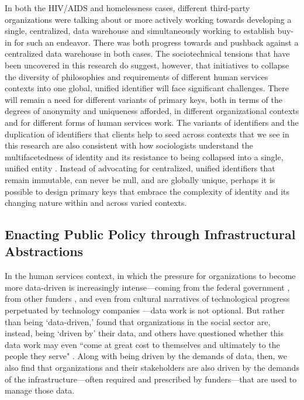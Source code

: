 In both the HIV/AIDS and homelessness cases, different third-party organizations were talking about or more actively working towards developing a single, centralized, data warehouse and simultaneously working to establish buy-in for such an endeavor. There was both progress towards and pushback against a centralized data warehouse in both cases. The sociotechnical tensions that have been uncovered in this research do suggest, however, that initiatives to collapse the diversity of philosophies and requirements of different human services contexts into one global, unified identifier will face significant challenges. There will remain a need for different variants of primary keys, both in terms of the degrees of anonymity and uniqueness afforded, in different organizational contexts and for different forms of human services work. The variants of identifiers and the duplication of identifiers that clients help to seed across contexts that we see in this research are also consistent with how sociologists understand the multifacetedness of identity and its resistance to being collapsed into a single, unified entity \citep{Farnham2011FacetID}. Instead of advocating for centralized, unified identifiers that remain immutable, can never be null, and are globally unique, perhaps it is possible to design primary keys that embrace the complexity of identity and its changing nature within and across varied contexts.

\subsection{Enacting Public Policy through Infrastructural Abstractions}

In the human services context, in which the pressure for organizations to become more data-driven is increasingly intense---coming from the federal government \citep{Haskins2011Building}, from other funders \citep{Bopp2017DbD,Voida2017Currencies,Benjamin2012FrontOut}, and even from cultural narratives of technological progress perpetuated by technology companies \citep{Harmon2017Fictions}---data work is not optional. But rather than being `data-driven,' \citet{Bopp2017DbD} found that organizations in the social sector are, instead, being `driven by' their data, and others have questioned whether this data work may even ``come at great cost to themselves and ultimately to the people they serve" \citep{Snibbe2006Drown}. Along with being driven by the demands of data, then, we also find that organizations and their stakeholders are also driven by the demands of the infrastructure---often required and prescribed by funders---that are used to manage those data.


